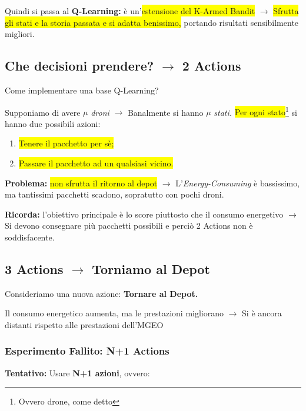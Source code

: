 \documentclass[12pt]{article}
\begin{document}
Quindi si passa al \textbf{Q-Learning:} è un'\colorbox{yellow}{estensione del K-Armed Bandit} $\rightarrow$ \colorbox{yellow}{Sfrutta gli stati e la storia passata e si adatta benissimo,} portando risultati sensibilmente migliori.

\subsection{Che decisioni prendere? $\rightarrow$ 2 Actions}

Come implementare una base Q-Learning? 

Supponiamo di avere $\mu$ \textit{droni} $\rightarrow$ Banalmente si hanno $\mu$ \textit{stati.} \colorbox{yellow}{Per ogni stato}\footnote{Ovvero drone, come detto} si hanno due possibili azioni:

\begin{enumerate}

    \item \colorbox{yellow}{Tenere il pacchetto per sè;}
    
    \item \colorbox{yellow}{Passare il pacchetto ad un qualsiasi vicino.}
    
\end{enumerate}

\textbf{Problema:} \colorbox{yellow}{non sfrutta il ritorno al depot} $\rightarrow$ L'\textit{Energy-Consuming} è bassissimo, ma tantissimi pacchetti scadono, sopratutto con pochi droni. 

\textbf{Ricorda:} l'obiettivo principale è lo score piuttosto che il consumo energetivo $\rightarrow$ Si devono consegnare più pacchetti possibili e perciò 2 Actions non è soddisfacente.

\subsection{3 Actions $\rightarrow$ Torniamo al Depot}

Consideriamo una nuova azione: \textbf{Tornare al Depot.}

Il consumo energetico aumenta, ma le prestazioni migliorano $\rightarrow$ Si è ancora distanti rispetto alle prestazioni dell'MGEO

\subsubsection{Esperimento \textbf{Fallito:} N+1 Actions}

\textbf{Tentativo:} Usare \textbf{N+1 azioni}, ovvero:
\end{document}
